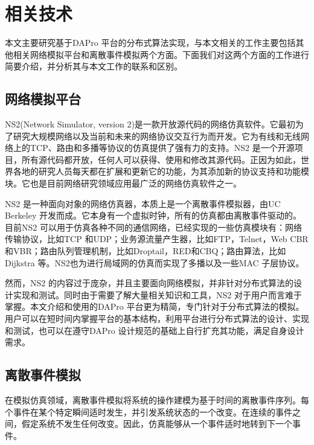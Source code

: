 ﻿%
\chapter{相关技术}
    本文主要研究基于DAPro 平台的分布式算法实现，与本文相关的工作主要包括其他相关网络模拟平台和离散事件模拟两个方面。下面我们对这两个方面的工作进行简要介绍，并分析其与本文工作的联系和区别。

    \section{网络模拟平台}
    NS2(Network Simulator, version 2)是一款开放源代码的网络仿真软件。它最初为了研究大规模网络以及当前和未来的网络协议交互行为而开发。它为有线和无线网络上的TCP、路由和多播等协议的仿真提供了强有力的支持。NS2 是一个开源项目，所有源代码都开放，任何人可以获得、使用和修改其源代码。正因为如此，世界各地的研究人员每天都在扩展和更新它的功能，为其添加新的协议支持和功能模块。它也是目前网络研究领域应用最广泛的网络仿真软件之一。

    NS2 是一种面向对象的网络仿真器，本质上是一个离散事件模拟器，由UC Berkeley 开发而成。它本身有一个虚拟时钟，所有的仿真都由离散事件驱动的。目前NS2 可以用于仿真各种不同的通信网络，已经实现的一些仿真模块有：网络传输协议，比如TCP 和UDP；业务源流量产生器，比如FTP，Telnet，Web CBR 和VBR；路由队列管理机制，比如Droptail，RED和CBQ；路由算法，比如Dijkstra 等。NS2也为进行局域网的仿真而实现了多播以及一些MAC 子层协议\cite{ns2introduction}。

    然而，NS2 的内容过于庞杂，并且主要面向网络模拟，并非针对分布式算法的设计实现和测试。同时由于需要了解大量相关知识和工具，NS2 对于用户而言难于掌握。本文介绍和使用的DAPro 平台更为精简，专门针对于分布式算法的模拟。用户可以在短时间内掌握平台的基本结构，利用平台进行分布式算法的设计、实现和测试，也可以在遵守DAPro 设计规范的基础上自行扩充其功能，满足自身设计需求。

    \section{离散事件模拟}
    在模拟仿真领域，离散事件模拟将系统的操作建模为基于时间的离散事件序列。每个事件在某个特定瞬间适时发生，并引发系统状态的一个改变\cite{robinson2004simulation}。在连续的事件之间，假定系统不发生任何改变。因此，仿真能够从一个事件适时地转到下一个事件。

